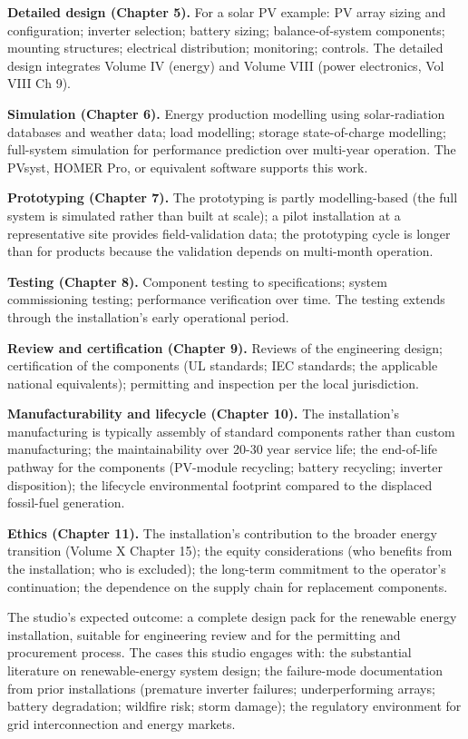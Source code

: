 \textbf{Detailed design (Chapter 5).} For a solar PV example: PV array sizing and configuration; inverter selection; battery sizing; balance-of-system components; mounting structures; electrical distribution; monitoring; controls. The detailed design integrates Volume IV (energy) and Volume VIII (power electronics, Vol VIII Ch 9).

\textbf{Simulation (Chapter 6).} Energy production modelling using solar-radiation databases and weather data; load modelling; storage state-of-charge modelling; full-system simulation for performance prediction over multi-year operation. The PVsyst, HOMER Pro, or equivalent software supports this work.

\textbf{Prototyping (Chapter 7).} The prototyping is partly modelling-based (the full system is simulated rather than built at scale); a pilot installation at a representative site provides field-validation data; the prototyping cycle is longer than for products because the validation depends on multi-month operation.

\textbf{Testing (Chapter 8).} Component testing to specifications; system commissioning testing; performance verification over time. The testing extends through the installation's early operational period.

\textbf{Review and certification (Chapter 9).} Reviews of the engineering design; certification of the components (UL standards; IEC standards; the applicable national equivalents); permitting and inspection per the local jurisdiction.

\textbf{Manufacturability and lifecycle (Chapter 10).} The installation's manufacturing is typically assembly of standard components rather than custom manufacturing; the maintainability over 20-30 year service life; the end-of-life pathway for the components (PV-module recycling; battery recycling; inverter disposition); the lifecycle environmental footprint compared to the displaced fossil-fuel generation.

\textbf{Ethics (Chapter 11).} The installation's contribution to the broader energy transition (Volume X Chapter 15); the equity considerations (who benefits from the installation; who is excluded); the long-term commitment to the operator's continuation; the dependence on the supply chain for replacement components.

The studio's expected outcome: a complete design pack for the renewable energy installation, suitable for engineering review and for the permitting and procurement process. The cases this studio engages with: the substantial literature on renewable-energy system design; the failure-mode documentation from prior installations (premature inverter failures; underperforming arrays; battery degradation; wildfire risk; storm damage); the regulatory environment for grid interconnection and energy markets.

